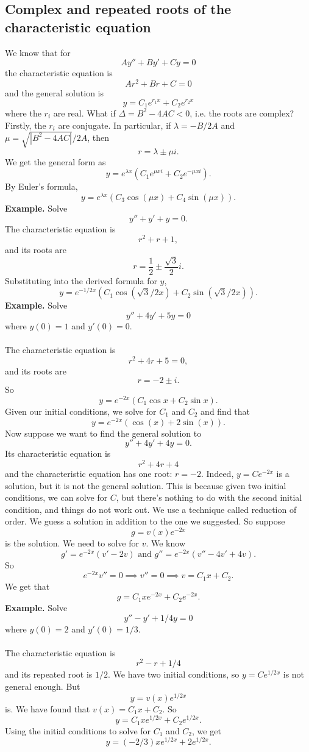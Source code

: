 \documentclass[11pt, oneside]{article}   	%
\begin{document}
\subsection{Complex and repeated roots of the characteristic equation}
We know that for 
$$
Ay'' + By'+Cy=0
$$
the characteristic equation is 
$$
Ar^2 + Br + C = 0
$$
and the general solution is 
$$
y  = C_1 e^{r_1x} + C_2 e^{r_2x}
$$
where the $r_i$ are real. What if $\Delta = B^2 - 4AC < 0$, i.e. the roots are complex? Firstly, the $r_i$ are conjugate. In particular, if $\lambda = -B/2A$ and $\mu = \sqrt{|B^2-4AC|}/2A$, then
$$
r = \lambda \pm \mu i. 
$$
We get the general form as 
$$
y = e^{\lambda x} (C_1e^{\mu x i} + C_2e^{-\mu x i}).
$$
By Euler's formula,
$$
y =  e^{\lambda x} (C_3\cos(\mu x) + C_4 \sin(\mu x)).
$$
\textbf{Example.} Solve 
$$
y'' + y' + y = 0.
$$
The characteristic equation is 
$$
r^2 + r + 1,
$$
and its roots are
$$
r = \frac{1}{2} \pm \frac{\sqrt 3}{2}i.
$$
Substituting into the derived formula for $y$,
$$
\boxed{y = e^{-1/2x}(C_1\cos (\sqrt 3/2x) + C_2\sin(\sqrt 3/2x)).}
$$
\textbf{Example.} Solve
$$
y'' + 4y' + 5y = 0
$$
where $y(0) =1 $ and $y'(0) = 0$.\\\\
The characteristic equation is
$$
r^2 + 4r + 5 = 0,
$$
and its roots are
$$
r = -2 \pm i.
$$
So
$$
y = e^{-2x}(C_1 \cos x + C_2\sin x).
$$
Given our initial conditions, we solve for $C_1$ and $C_2$ and find that
$$
\boxed{y = e^{-2x} (\cos( x) + 2\sin (x)).}
$$
Now suppose we want to find the general solution to
$$
y'' + 4y' + 4y = 0.
$$
Its characteristic equation is
$$
r^2 + 4r + 4 
$$
and the characteristic equation has one root: $r=-2$. Indeed, $y=Ce^{-2x}$ is a solution, but it is not the general solution. This is because given two initial conditions, we can solve for $C$, but there's nothing to do with the second initial condition, and things do not work out. We use a technique called reduction of order. We guess a solution in addition to the one we suggested. So suppose
$$
g = v(x)e^{-2x}
$$
is the solution. We need to solve for $v$. We know
$$
g' = e^{-2x}(v' - 2v) \textrm{ and } g'' = e^{-2x}(v''-4v'+4v).
$$
So
$$
e^{-2x}v''  =0\implies  v'' = 0\implies v = C_1x+C_2.
$$
We get that
$$
g = C_1xe^{-2x} + C_2e^{-2x}.
$$
\textbf{Example.} Solve
$$
y'' - y' + 1/4 y = 0
$$
where $y(0)=2$ and $y'(0) = 1/3$.\\\\
The characteristic equation is 
$$
r^2 - r + 1/4
$$
and its repeated root is $1/2$. We have two initial conditions, so $y=Ce^{1/2x} $ is not general enough. But
$$
y= v(x)e^{1/2x}
$$
is. We have found that $v(x) = C_1x+C_2$. So 
$$
y = C_1xe^{1/2x}+ C_2e^{1/2x}.
$$
Using the initial conditions to solve for $C_1$ and $C_2$, we get
$$
\boxed{y = (-2/3)xe^{1/2x}+ 2e^{1/2x}.}
$$
\end{document}
